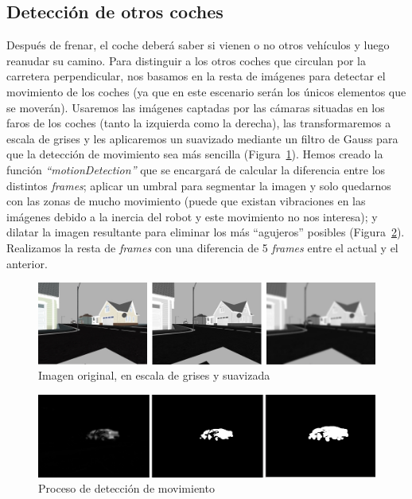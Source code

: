 \subsection{Detección de otros coches}
Después de frenar, el coche deberá saber si vienen o no otros vehículos y luego reanudar su camino. Para distinguir a los otros coches que circulan por la carretera perpendicular, nos basamos en la resta de imágenes para detectar el movimiento de los coches (ya que en este escenario serán los únicos elementos que se moverán). Usaremos las imágenes captadas por las cámaras situadas en los faros de los coches (tanto la izquierda como la derecha), las transformaremos a escala de grises y les aplicaremos un suavizado mediante un filtro de Gauss para que la detección de movimiento sea más sencilla (Figura~\ref{fig.imgL}). Hemos creado la función \textit{``motionDetection''} que se encargará de calcular la diferencia entre los distintos \textit{frames}; aplicar un umbral para segmentar la imagen y solo quedarnos con las zonas de mucho movimiento (puede que existan vibraciones en las imágenes debido a la inercia del robot y este movimiento no nos interesa); y dilatar la imagen resultante para eliminar los más ``agujeros'' posibles (Figura~\ref{fig.motionDetection}). Realizamos la resta de \textit{frames} con una diferencia de 5 \textit{frames} entre el actual y el anterior. 

\begin{figure}[H]
  \begin{center}
    \includegraphics[width=1.0\textwidth]{figures/Stop/imgL.jpg}
		\caption{Imagen original, en escala de grises y suavizada}
		\label{fig.imgL}
		\end{center}
\end{figure}

\begin{figure}[H]
  \begin{center}
    \includegraphics[width=1.0\textwidth]{figures/Stop/motionDetection.jpg}
		\caption{Proceso de detección de movimiento}
		\label{fig.motionDetection}
		\end{center}
\end{figure}

